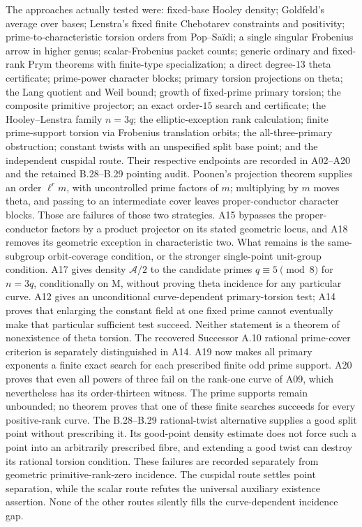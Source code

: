 \documentclass[11pt,a4paper]{article}
\begin{document}
The approaches actually tested were: fixed-base Hooley density;
Goldfeld's average over bases; Lenstra's fixed finite Chebotarev
constraints and positivity; prime-to-characteristic torsion orders
from Pop--Sa\"idi; a single singular Frobenius arrow in higher genus;
scalar-Frobenius packet counts; generic ordinary and fixed-rank
Prym theorems with finite-type specialization; a direct degree-$13$
theta certificate; prime-power character blocks; primary torsion
projections on theta; the Lang quotient and Weil bound; growth of
fixed-prime primary torsion; the composite primitive projector;
an exact order-$15$ search and certificate; the Hooley--Lenstra
family $n=3q$; the elliptic-exception rank calculation; finite
prime-support torsion via Frobenius translation orbits; the
all-three-primary obstruction; constant twists with an unspecified
split base point; and the independent cuspidal route.
Their respective endpoints are recorded in A02--A20 and the
retained B.28--B.29 pointing audit. Poonen's
projection theorem supplies an order $\ell^r m$, with uncontrolled
prime factors of $m$; multiplying by $m$ moves theta, and passing to
an intermediate cover leaves proper-conductor character blocks.
Those are failures of those two strategies. A15 bypasses the
proper-conductor factors by a product projector on its stated
geometric locus, and A18 removes its geometric exception in
characteristic two. What remains is the same-subgroup orbit-coverage
condition, or the stronger single-point unit-group condition.
A17 gives density $\mathcal A/2$ to the candidate primes
$q\equiv5\pmod8$ for $n=3q$, conditionally on M, without proving
theta incidence for any particular curve. A12 gives an unconditional
curve-dependent primary-torsion test; A14 proves that enlarging the
constant field at one fixed prime cannot eventually make that
particular sufficient test succeed. Neither statement is a theorem
of nonexistence of theta torsion. The recovered Successor A.10
rational prime-cover criterion is separately distinguished in A14.
A19 now makes all primary exponents a finite exact search for
each prescribed finite odd prime support. A20 proves that even
all powers of three fail on the rank-one curve of A09, which
nevertheless has its order-thirteen witness. The prime supports
remain unbounded; no theorem proves that one of these finite
searches succeeds for every positive-rank curve.
The B.28--B.29 rational-twist alternative supplies a good split
point without prescribing it. Its good-point density estimate
does not force such a point into an arbitrarily prescribed fibre,
and extending a good twist can destroy its rational torsion
condition. These failures are recorded separately from geometric
primitive-rank-zero incidence.
The cuspidal route
settles point separation, while the scalar route refutes the
universal auxiliary existence assertion. None of the other routes
silently fills the curve-dependent incidence gap.
\end{document}
